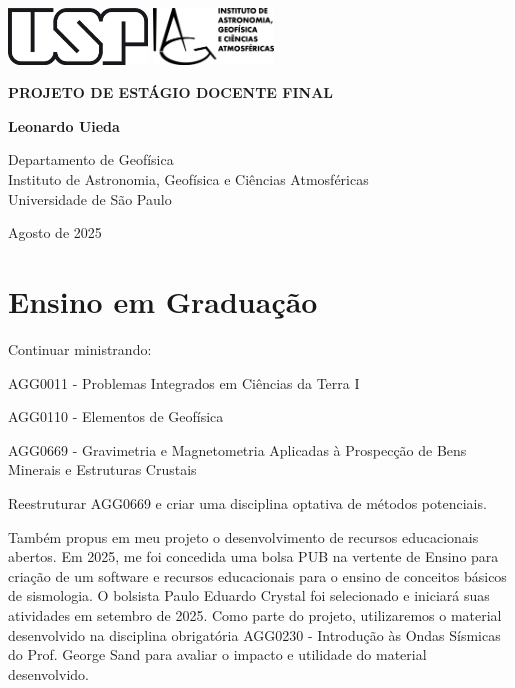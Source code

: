 \documentclass[12pt,a4paper,oneside]{book}
\newcommand{\Title}{Projeto de Estágio Docente Final}
\newcommand{\Year}{2025}
\newcommand{\Date}{Agosto de \Year{}}
\newcommand{\Author}{Leonardo Uieda}
\begin{document}
\pagestyle{empty}
\frontmatter

\begin{titlepage}
  \begin{center}
    \includegraphics[height=1.5cm]{figures/usp.png}
    \hfill
    \includegraphics[height=1.5cm]{figures/iag.png}
    \vspace{9cm}

    \textbf{\Huge \MakeUppercase{\Title{}}}
    \vspace{2cm}

    \textbf{\LARGE \Author{}}
    \vfill

    Departamento de Geofísica
    \\
    Instituto de Astronomia, Geofísica e Ciências Atmosféricas
    \\
    Universidade de São Paulo
    \vspace{2cm}

    \Date{}
  \end{center}
\end{titlepage}

\tableofcontents

\mainmatter
\pagestyle{fancy}

\chapter{Ensino em Graduação}

Continuar ministrando:

AGG0011 - Problemas Integrados em Ciências da Terra I

AGG0110 - Elementos de Geofísica

AGG0669 - Gravimetria e Magnetometria Aplicadas à Prospecção de Bens Minerais e Estruturas Crustais

Reestruturar AGG0669 e criar uma disciplina optativa de métodos potenciais.

Também propus em meu projeto o desenvolvimento de recursos educacionais abertos. Em 2025, me foi concedida uma bolsa PUB na vertente de Ensino para criação de um software e recursos educacionais para o ensino de conceitos básicos de sismologia. O bolsista Paulo Eduardo Crystal foi selecionado e iniciará suas atividades em setembro de 2025. Como parte do projeto, utilizaremos o material desenvolvido na disciplina obrigatória AGG0230 - Introdução às Ondas Sísmicas do Prof. George Sand para avaliar o impacto e utilidade do material desenvolvido.
\end{document}
